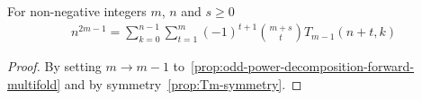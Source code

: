 \begin{proposition}
    \label{prop:odd-power-decomposition-forward-m-1-shifted-multifold}
    For non-negative integers $m$, $n$ and $s\geq 0$
    \begin{align*}
        n^{2m-1} = \sum_{k=0}^{n-1} \sum_{t=1}^{m} (-1)^{t+1} \binom{m+s}{t} T_{m-1} (n+t, k)
    \end{align*}
    \begin{proof}
        By setting $m \rightarrow m-1$ to~\eqref{prop:odd-power-decomposition-forward-multifold} and
        by symmetry~\eqref{prop:Tm-symmetry}.
    \end{proof}
\end{proposition}
